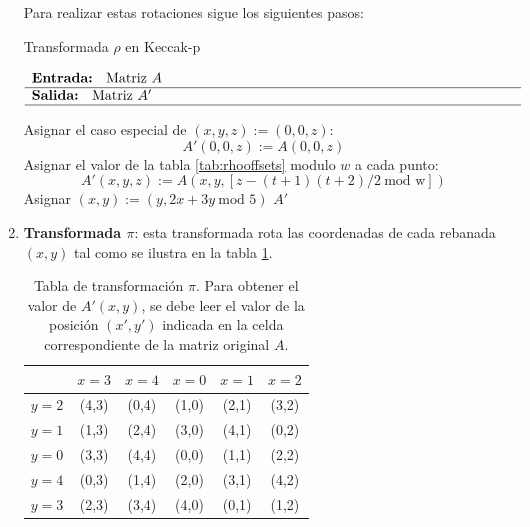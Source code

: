 \begin{enumerate}
	Para realizar estas rotaciones sigue los siguientes pasos:
	\begin{algorithm}[H]
		\caption{Transformada \(\rho\) en Keccak-p}
		$\begin{array}{p{\textwidth}}
			\textbf{Entrada: } Matriz \(A\) \\ 
			\hline
			\textbf{Salida: } Matriz \(A'\) \\ 
			\hline
		\end{array}$
		\begin{algorithmic}[1]
			\State Asignar el caso especial de \((x,y,z):=(0,0,z)\):
			\begin{equation}
				A'(0,0,z):=A(0,0,z)
			\end{equation}
			 
			\State Asignar el valor de la tabla \ref{tab:rhooffsets} modulo \(w\) a cada punto:
			\begin{equation}
				A'(x,y,z):=A(x,y,[z-(t+1)(t+2)/2 \ \text{mod w}])
			\end{equation}
			\State Asignar \((x,y):=(y,2x+3y \ \text{mod } 5)\)
			\EndFor
			\State \Return \(A'\)
		\end{algorithmic}
	\end{algorithm}
	\newpage
	\item \textbf{Transformada \(\pi\)}: esta transformada rota las coordenadas de cada rebanada \((x,y)\) tal como se ilustra en la tabla \ref{tab:piTransform}.
	
	\begin{table}[H]
		\centering
		\begin{tabular}{|c|c|c|c|c|c|}
					\hline
			& $x = 3$ & $x = 4$ & $x = 0$ & $x = 1$ & $x = 2$ \\
			\hline
			$y = 2$ & (4,3) & (0,4) & (1,0) & (2,1) & (3,2) \\
			\hline
			$y = 1$ & (1,3) & (2,4) & (3,0) & (4,1) & (0,2) \\
			\hline
			$y = 0$ & (3,3) & (4,4) & (0,0) & (1,1) & (2,2) \\
			\hline
			$y = 4$ & (0,3) & (1,4) & (2,0) & (3,1) & (4,2) \\
			\hline
			$y = 3$ & (2,3) & (3,4) & (4,0) & (0,1) & (1,2) \\
			\hline
		\end{tabular}
		\caption{Tabla de transformación $\pi$. Para obtener el valor de $A'(x,y)$, se debe leer el valor de la posición $(x',y')$ indicada en la celda correspondiente de la matriz original $A$.}
		\label{tab:piTransform}
	\end{table}
	

\end{enumerate}
